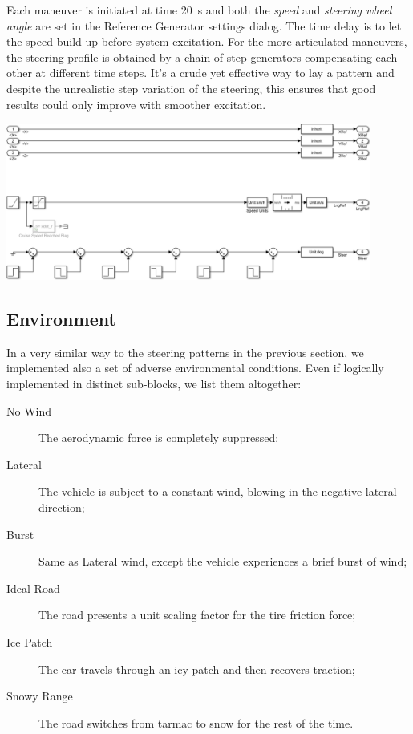 		Each maneuver is initiated at time \SI{20}{\second} and both the \emph{speed} and \emph{steering wheel angle} are set in the Reference Generator settings dialog.
		The time delay is to let the speed build up before system excitation. For the more articulated maneuvers, the steering profile is obtained by a chain of step generators
		compensating each other at different time steps. It's a crude yet effective way to lay a pattern and despite the unrealistic step variation of the steering, this ensures that
		good results could only improve with smoother excitation.
		\begin{center}
			\includegraphics[width=0.9\textwidth]{Images/Simulator/cm-s-full}
		\end{center}


		\subsection{Environment}

		In a very similar way to the steering patterns in the previous section, we implemented also a set of adverse environmental conditions.
		Even if logically implemented in distinct sub-blocks, we list them altogether:
		\begin{description}

			\item[No Wind] The aerodynamic force is completely suppressed;

			\item[Lateral] The vehicle is subject to a constant wind, blowing in the negative lateral direction;

			\item[Burst] Same as Lateral wind, except the vehicle experiences a brief burst of wind;

			\item[Ideal Road] The road presents a unit scaling factor for the tire friction force;

			\item[Ice Patch] The car travels through an icy patch and then recovers traction;

			\item[Snowy Range] The road switches from tarmac to snow for the rest of the time.

		\end{description}
		
